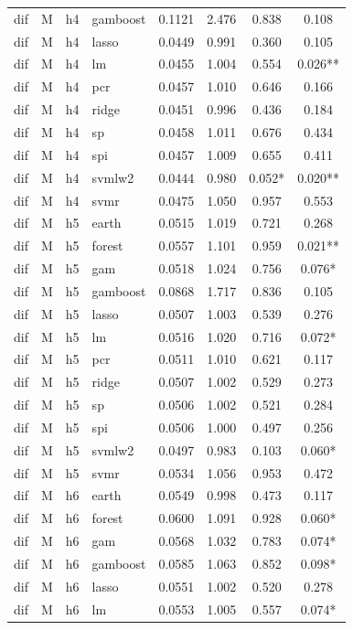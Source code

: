 \begin{ThreePartTable}
\begin{longtable}[t]{llclcccc}
dif & M & h4 & gamboost & 0.1121 & 2.476 & 0.838 & 0.108\\
dif & M & h4 & lasso & 0.0449 & 0.991 & 0.360 & 0.105\\
dif & M & h4 & lm & 0.0455 & 1.004 & 0.554 & 0.026**\\
dif & M & h4 & pcr & 0.0457 & 1.010 & 0.646 & 0.166\\
dif & M & h4 & ridge & 0.0451 & 0.996 & 0.436 & 0.184\\
dif & M & h4 & sp & 0.0458 & 1.011 & 0.676 & 0.434\\
dif & M & h4 & spi & 0.0457 & 1.009 & 0.655 & 0.411\\
dif & M & h4 & svmlw2 & 0.0444 & 0.980 & 0.052* & 0.020**\\
dif & M & h4 & svmr & 0.0475 & 1.050 & 0.957 & 0.553\\
\addlinespace
dif & M & h5 & earth & 0.0515 & 1.019 & 0.721 & 0.268\\
dif & M & h5 & forest & 0.0557 & 1.101 & 0.959 & 0.021**\\
dif & M & h5 & gam & 0.0518 & 1.024 & 0.756 & 0.076*\\
dif & M & h5 & gamboost & 0.0868 & 1.717 & 0.836 & 0.105\\
dif & M & h5 & lasso & 0.0507 & 1.003 & 0.539 & 0.276\\
dif & M & h5 & lm & 0.0516 & 1.020 & 0.716 & 0.072*\\
dif & M & h5 & pcr & 0.0511 & 1.010 & 0.621 & 0.117\\
dif & M & h5 & ridge & 0.0507 & 1.002 & 0.529 & 0.273\\
dif & M & h5 & sp & 0.0506 & 1.002 & 0.521 & 0.284\\
dif & M & h5 & spi & 0.0506 & 1.000 & 0.497 & 0.256\\
dif & M & h5 & svmlw2 & 0.0497 & 0.983 & 0.103 & 0.060*\\
dif & M & h5 & svmr & 0.0534 & 1.056 & 0.953 & 0.472\\
\addlinespace
dif & M & h6 & earth & 0.0549 & 0.998 & 0.473 & 0.117\\
dif & M & h6 & forest & 0.0600 & 1.091 & 0.928 & 0.060*\\
dif & M & h6 & gam & 0.0568 & 1.032 & 0.783 & 0.074*\\
dif & M & h6 & gamboost & 0.0585 & 1.063 & 0.852 & 0.098*\\
dif & M & h6 & lasso & 0.0551 & 1.002 & 0.520 & 0.278\\
dif & M & h6 & lm & 0.0553 & 1.005 & 0.557 & 0.074*\\

\end{longtable}
\end{ThreePartTable}
